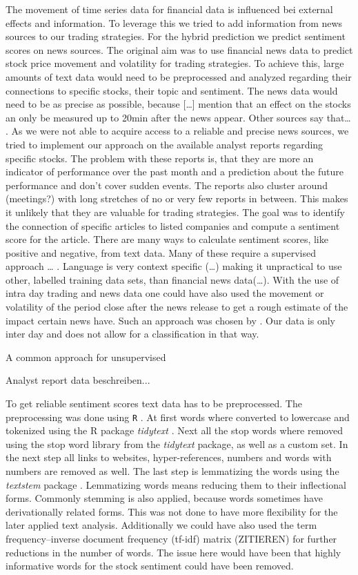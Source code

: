 The movement of time series data for financial data is influenced bei external effects and information. To leverage this we tried to add information from news sources to our trading strategies. For the hybrid prediction we predict sentiment scores on news sources. The original aim was to use financial news data to predict stock price movement and volatility for trading strategies. To achieve this, large amounts of text data would need to be preprocessed and analyzed regarding their connections to specific stocks, their topic and sentiment. The news data would need to be as precise as possible, because […] mention that an effect on the stocks an only be measured up to 20min after the news appear. Other sources say that… .
% 
As we were not able to acquire access to a reliable and precise news sources, we tried to implement our approach on the available analyst reports regarding specific stocks. The problem with these reports is, that they are more an indicator of performance over the past month and a prediction about the future performance and don't cover sudden events. The reports also cluster around (meetings?) with long stretches of no or very few reports in between. This makes it unlikely that they are valuable for trading strategies.
%
The goal was to identify the connection of specific articles to listed companies and compute a sentiment score for the article. There are many ways to calculate sentiment scores, like positive and negative, from text data. Many of these require a supervised approach … . Language is very context specific (…) making it unpractical to use other, labelled training data sets, than financial news data(…). With the use of intra day trading and news data one could have also used the movement or volatility of the period close after the news release to get a rough estimate of the impact certain news have. Such an approach was chosen by \citet{robertson2007news}. Our data is only inter day and does not allow for a classification in that way. 

A common approach for unsupervised 


Analyst report data beschreiben...

To get reliable sentiment scores text data has to be preprocessed. The preprocessing was done using \texttt{R} \citep{Rproject}. At first words where converted to lowercase and tokenized using the R package \textit{tidytext} \citep{tidytext}. Next all the stop words where removed using the stop word library from the \textit{tidytext} package, as well as a custom set. In the next step all links to websites, hyper-references, numbers and words with numbers are removed as well. 
The last step is lemmatizing the words using the \textit{textstem} package \citep{textstem}. Lemmatizing words means reducing them to their inflectional forms. Commonly stemming is also applied, because words sometimes have derivationally related forms. This was not done to have more flexibility for the later applied text analysis. Additionally we could have also used the term frequency–inverse document frequency (tf-idf) matrix (ZITIEREN) for further reductions in the number of words. The issue here would have been that highly informative words for the stock sentiment could have been removed. 

